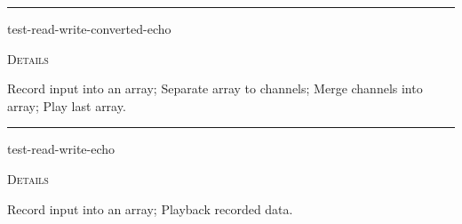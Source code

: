 \documentclass[a4paper]{report}
\begin{document}
    \rule{\linewidth}{0.1mm}
    
    \label{portaudio-tests__fun__test-read-write-converted-echo}
    \begin{defun}[Function]
    test-read-write-converted-echo


	
    \bigskip
    \textsc{Details}

Record input into an array; Separate array to channels; Merge channels into array; Play last array.


    
    \end{defun}
  
  

    \rule{\linewidth}{0.1mm}
    
    \label{portaudio-tests__fun__test-read-write-echo}
    \begin{defun}[Function]
    test-read-write-echo


	
    \bigskip
    \textsc{Details}

Record input into an array; Playback recorded data.


    
    \end{defun}
  
  

    \printindex
    
\end{document}

